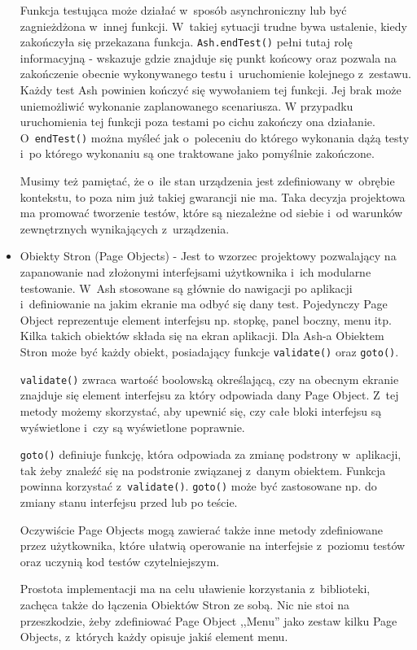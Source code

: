 \documentclass[brudnopis]{xmgr}
\begin{document}
\begin{itemize}
Funkcja testująca może działać w~sposób asynchroniczny lub być zagnieżdżona w~innej funkcji. W~takiej sytuacji trudne bywa ustalenie, kiedy zakończyła się przekazana funkcja. \texttt{Ash.endTest()} pełni tutaj rolę informacyjną - wskazuje gdzie znajduje się punkt końcowy oraz pozwala na zakończenie obecnie wykonywanego testu i~uruchomienie kolejnego z~zestawu. Każdy test Ash powinien kończyć się wywołaniem tej funkcji. Jej brak może uniemożliwić wykonanie zaplanowanego scenariusza. W przypadku uruchomienia tej funkcji poza testami po cichu zakończy ona działanie. O~\texttt{endTest()} można myśleć jak o~poleceniu do którego wykonania dążą testy i~po którego wykonaniu są one traktowane jako pomyślnie zakończone. 

Musimy też pamiętać, że o~ile stan urządzenia jest zdefiniowany w~obrębie kontekstu, to poza nim już takiej gwarancji nie ma. Taka decyzja projektowa ma promować tworzenie testów, które są  niezależne od siebie i~od warunków zewnętrznych wynikających z~urządzenia.

  \item Obiekty Stron (Page Objects) - Jest to wzorzec projektowy pozwalający na zapanowanie nad złożonymi interfejsami użytkownika i~ich modularne testowanie. W~Ash stosowane są głównie do nawigacji po aplikacji i~definiowanie na jakim ekranie ma odbyć się dany test. Pojedynczy Page Object reprezentuje element interfejsu np. stopkę, panel boczny, menu itp. Kilka takich obiektów składa się na ekran aplikacji. Dla Ash-a Obiektem Stron może być każdy obiekt, posiadający funkcje \texttt{validate()} oraz \texttt{goto()}.

\texttt{validate()} zwraca wartość boolowską określającą, czy na obecnym ekranie znajduje się element interfejsu za który odpowiada dany Page Object. Z~tej metody możemy skorzystać, aby upewnić się, czy całe bloki interfejsu są wyświetlone i~czy są wyświetlone poprawnie.

\texttt{goto()} definiuje funkcję, która odpowiada za zmianę podstrony w~aplikacji, tak żeby znaleźć się na podstronie związanej z~danym obiektem. Funkcja powinna korzystać z~\texttt{validate()}. \texttt{goto()} może być zastosowane np. do zmiany stanu interfejsu przed lub po teście.

Oczywiście Page Objects mogą zawierać także inne metody zdefiniowane przez użytkownika, które ułatwią operowanie na interfejsie z~poziomu testów oraz uczynią kod testów czytelniejszym.

Prostota implementacji ma na celu uławienie korzystania z~biblioteki, zachęca także do łączenia Obiektów Stron ze sobą. Nic nie stoi na przeszkodzie, żeby zdefiniować Page Object ,,Menu'' jako zestaw kilku Page Objects, z~których każdy opisuje jakiś element menu. 


\end{itemize}
\end{document}
